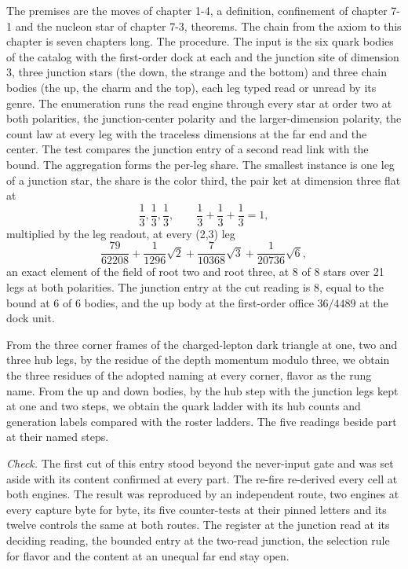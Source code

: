 \begin{chproof}
The premises are the moves of chapter 1-4, a definition, confinement of chapter 7-1 and the nucleon star of chapter 7-3, theorems. The chain from the axiom to this chapter is seven chapters long. The procedure. The input is the six quark bodies of the catalog with the first-order dock at each and the junction site of dimension 3, three junction stars (the down, the strange and the bottom) and three chain bodies (the up, the charm and the top), each leg typed read or unread by its genre. The enumeration runs the read engine through every star at order two at both polarities, the junction-center polarity and the larger-dimension polarity, the count law at every leg with the traceless dimensions at the far end and the center. The test compares the junction entry of a second read link with the bound. The aggregation forms the per-leg share. The smallest instance is one leg of a junction star, the share is the color third, the pair ket at dimension three flat at
\begin{equation}
\frac{1}{3}, \frac{1}{3}, \frac{1}{3}, \qquad \frac{1}{3} + \frac{1}{3} + \frac{1}{3} = 1 ,
\end{equation}
multiplied by the leg readout, at every (2,3) leg
\begin{equation}
\frac{79}{62208} + \frac{1}{1296}\sqrt{2} + \frac{7}{10368}\sqrt{3} + \frac{1}{20736}\sqrt{6} ,
\end{equation}
an exact element of the field of root two and root three, at 8 of 8 stars over 21 legs at both polarities. The junction entry at the cut reading is 8, equal to the bound at 6 of 6 bodies, and the up body at the first-order office $36/4489$ at the dock unit.

From the three corner frames of the charged-lepton dark triangle at one, two and three hub legs, by the residue of the depth momentum modulo three, we obtain the three residues of the adopted naming at every corner, flavor as the rung name. From the up and down bodies, by the hub step with the junction legs kept at one and two steps, we obtain the quark ladder with its hub counts and generation labels compared with the roster ladders. The five readings beside part at their named steps.

\emph{Check.} The first cut of this entry stood beyond the never-input gate and was set aside with its content confirmed at every part. The re-fire re-derived every cell at both engines. The result was reproduced by an independent route, two engines at every capture byte for byte, its five counter-tests at their pinned letters and its twelve controls the same at both routes.
The register at the junction read at its deciding reading, the bounded entry at the two-read junction, the selection rule for flavor and the content at an unequal far end stay open.
\end{chproof}
\label{chend:VII-7-quark-content-and-flavour}

